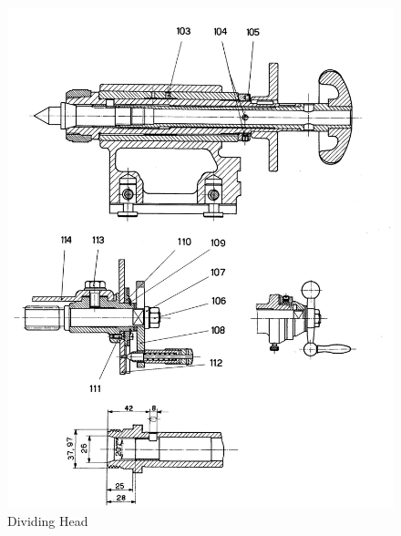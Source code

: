 \newpage
\begin{figure}[h]
    \centering
    \includegraphics[width=1.0\linewidth]{images/page_47}
    \caption{Dividing Head}
    \label{fig:dividing_head_2}
\end{figure}
